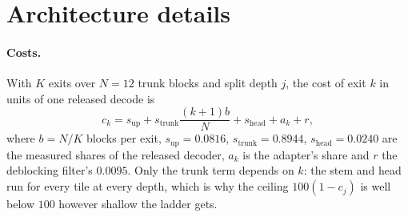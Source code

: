%
%
%
%

\section{Architecture details}

\paragraph{Costs.} With $K$ exits over $N{=}12$ trunk blocks and split depth $j$,
the cost of exit $k$ in units of one released decode is
\begin{equation}
c_k = s_{\mathrm{up}} + s_{\mathrm{trunk}}\frac{(k{+}1)b}{N}
      + s_{\mathrm{head}} + a_k + r,
\end{equation}
where $b = N/K$ blocks per exit, $s_{\mathrm{up}} = 0.0816$,
$s_{\mathrm{trunk}} = 0.8944$, $s_{\mathrm{head}} = 0.0240$ are the measured
shares of the released decoder, $a_k$ is the adapter's share and $r$ the
deblocking filter's $0.0095$. Only the trunk term depends on $k$: the stem and
head run for every tile at every depth, which is why the ceiling
$100(1-c_j)$ is well below $100$ however shallow the ladder gets.

